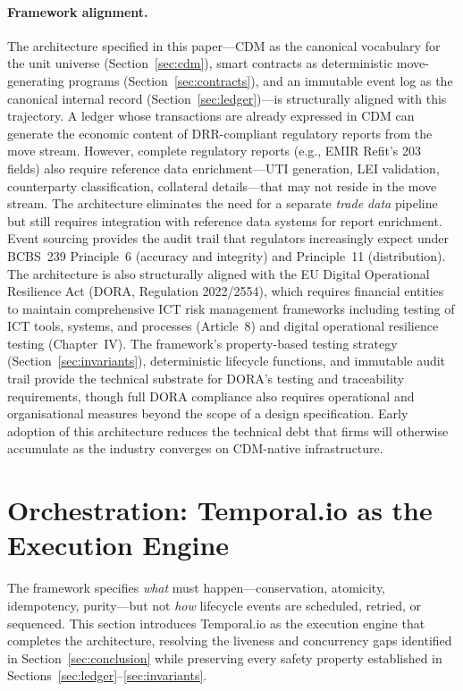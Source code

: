 \documentclass[11pt,a4paper]{article}
\begin{document}
\paragraph{Framework alignment.}
The architecture specified in this paper---CDM as the canonical vocabulary for the unit universe (Section~\ref{sec:cdm}), smart contracts as deterministic move-generating programs (Section~\ref{sec:contracts}), and an immutable event log as the canonical internal record (Section~\ref{sec:ledger})---is structurally aligned with this trajectory. A ledger whose transactions are already expressed in CDM can generate the economic content of DRR-compliant regulatory reports from the move stream. However, complete regulatory reports (e.g., EMIR Refit's 203 fields) also require reference data enrichment---UTI generation, LEI validation, counterparty classification, collateral details---that may not reside in the move stream. The architecture eliminates the need for a separate \emph{trade data} pipeline but still requires integration with reference data systems for report enrichment. Event sourcing provides the audit trail that regulators increasingly expect under BCBS~239 Principle~6 (accuracy and integrity) and Principle~11 (distribution). The architecture is also structurally aligned with the EU Digital Operational Resilience Act (DORA, Regulation 2022/2554), which requires financial entities to maintain comprehensive ICT risk management frameworks including testing of ICT tools, systems, and processes (Article~8) and digital operational resilience testing (Chapter~IV). The framework's property-based testing strategy (Section~\ref{sec:invariants}), deterministic lifecycle functions, and immutable audit trail provide the technical substrate for DORA's testing and traceability requirements, though full DORA compliance also requires operational and organisational measures beyond the scope of a design specification. Early adoption of this architecture reduces the technical debt that firms will otherwise accumulate as the industry converges on CDM-native infrastructure.

\clearpage
\section{Orchestration: Temporal.io as the Execution Engine}
\label{sec:temporal}

The framework specifies \emph{what} must happen---conservation, atomicity, idempotency, purity---but not \emph{how} lifecycle events are scheduled, retried, or sequenced. This section introduces Temporal.io as the execution engine that completes the architecture, resolving the liveness and concurrency gaps identified in Section~\ref{sec:conclusion} while preserving every safety property established in Sections~\ref{sec:ledger}--\ref{sec:invariants}.
\end{document}

